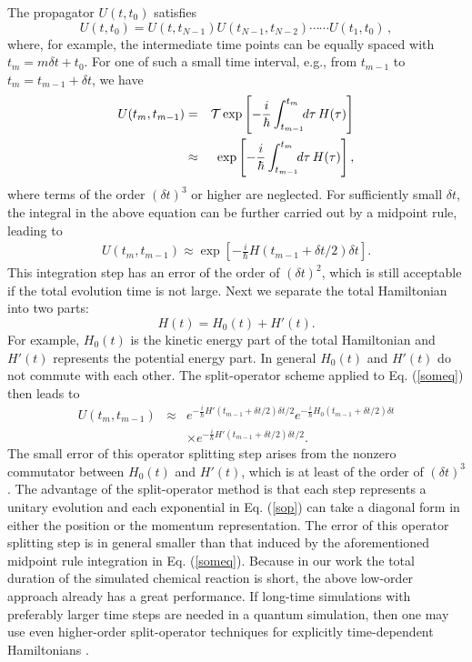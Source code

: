 \documentclass[twocolumn,showpacs,twoside,10pt,prl]{revtex4}
\newcommand{\be}{\begin{equation}}
\newcommand{\ee}{\end{equation}}
\begin{document}
The propagator $U(t,t_0)$  satisfies
\be
     U(t,t_0)=   U(t,t_{N-1})   U(t_{N-1},t_{N-2})\cdots\cdots   U(t_1,t_0)\,,
\ee
where, for example, the intermediate time points can be equally spaced with $t_m=m\delta t+t_0$.
For one of such a small time interval, e.g., from $t_{m-1}$ to $t_{m}=t_{m-1}+\delta t$, we have
\begin{eqnarray}
     U(t_{m},t_{m-1})& = &{\cal T} \exp\left[-\frac{i}{\hbar}
  \int_{t_{m-1}}^{t_m}\!\!d\tau\,   H(\tau)\right] \nonumber \\
  &\approx & \exp\left[-\frac{i}{\hbar}
  \int_{t_{m-1}}^{t_m}\!\!d\tau\,   H(\tau)\right],
\end{eqnarray}
where terms of the order $(\delta t)^3$ or higher are neglected.  For sufficiently small $\delta t$,
the integral in the above equation can be further carried out by a midpoint rule, leading to
\begin{eqnarray}
     U(t_{m},t_{m-1})\approx \exp\left[-\frac{i}{\hbar} H(t_{m-1}+\delta t/2) \delta t\right].
     \label{someq}
\end{eqnarray}
This integration step has an error of the order of $(\delta t)^2$, which is still acceptable if the total evolution time
is not large.
Next we separate the total Hamiltonian into two parts:
\be
     H(t)=   H_0(t)+   H'(t).
\ee
For example, $H_0(t)$ is the kinetic energy part of the total Hamiltonian and $H'(t)$ represents the potential energy part.  In general
$H_0(t)$ and $H'(t)$ do not commute with each other.
The split-operator scheme \cite{Feit2}  applied to Eq. (\ref{someq}) then leads to
\begin{eqnarray}
  {U}(t_m,t_{m-1}) & \approx & 
   e^{-\frac{i}{\hbar}   H' (t_{m-1}+\delta t/2)    \delta t/2}
   e^{-\frac{i}{\hbar}   H_0  (t_{m-1}+\delta t/2)  \delta t  }  \nonumber \\
  & & \times  e^{-\frac{i}{\hbar}   H' (t_{m-1}+\delta t/2)             \delta t/2}.
 \label{sop}
\end{eqnarray}
The small error of this operator splitting step arises from the nonzero commutator between
$ H_0(t)$ and $H'(t)$, which is at least of the order of $(\delta t)^3$.  The advantage of
the split-operator method is that each step represents a unitary evolution and each exponential in Eq. (\ref{sop}) can take a diagonal form
in either the position or the momentum representation.
  The error of this operator splitting step
is in general smaller than that induced by the aforementioned midpoint rule integration in
Eq. (\ref{someq}). Because in our work the total duration of the
simulated chemical reaction is short, the above low-order approach already has a great performance.
If long-time simulations with preferably larger time steps are needed in a quantum simulation,
then one may use even higher-order split-operator techniques for explicitly time-dependent Hamiltonians \cite{bandrauk,zhu}.
\end{document}
